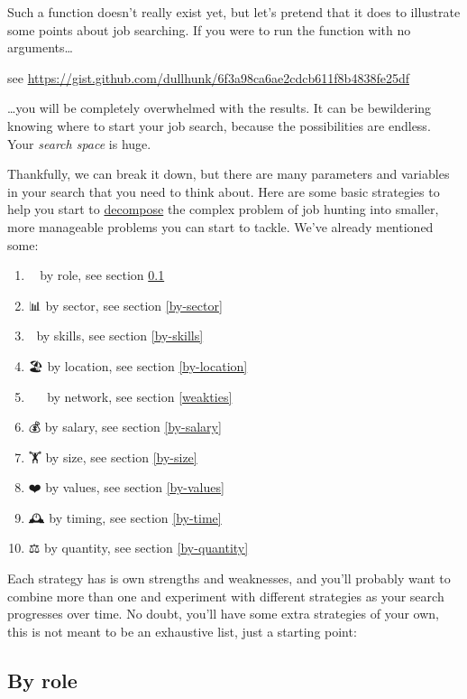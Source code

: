 \documentclass[
]{book}
\providecommand{\tightlist}{%
  \setlength{\itemsep}{0pt}\setlength{\parskip}{0pt}}
\begin{document}
Such a function doesn't really exist yet, but let's pretend that it does to illustrate some points about job searching. If you were to run the function with no arguments\ldots{}

see \url{https://gist.github.com/dullhunk/6f3a98ca6ae2cdcb611f8b4838fe25df}

\ldots you will be completely overwhelmed with the results. It can be bewildering knowing where to start your job search, because the possibilities are endless. Your \emph{search space} is huge.

Thankfully, we can break it down, but there are many parameters and variables in your search that you need to think about. Here are some basic strategies to help you start to \href{https://en.wikipedia.org/wiki/Decomposition_(computer_science)}{decompose} the complex problem of job hunting into smaller, more manageable problems you can start to tackle. We've already mentioned some:

\begin{enumerate}
\def\labelenumi{\arabic{enumi}.}
\tightlist
\item
  👨‍🔬 by role, see section \ref{by-role}
\item
  📊 by sector, see section \ref{by-sector}
\item
  💪 by skills, see section \ref{by-skills}
\item
  🏖️ by location, see section \ref{by-location}
\item
  👨‍👩‍👧‍👦 by network, see section \ref{weakties}
\item
  💰 by salary, see section \ref{by-salary}
\item
  🏋️ by size, see section \ref{by-size}
\item
  ❤️ by values, see section \ref{by-values}
\item
  🕰 by timing, see section \ref{by-time}
\item
  ⚖️ by quantity, see section \ref{by-quantity}
\end{enumerate}

Each strategy has is own strengths and weaknesses, and you'll probably want to combine more than one and experiment with different strategies as your search progresses over time. No doubt, you'll have some extra strategies of your own, this is not meant to be an exhaustive list, just a starting point:

\hypertarget{by-role}{%
\subsection{By role}\label{by-role}}
\end{document}
